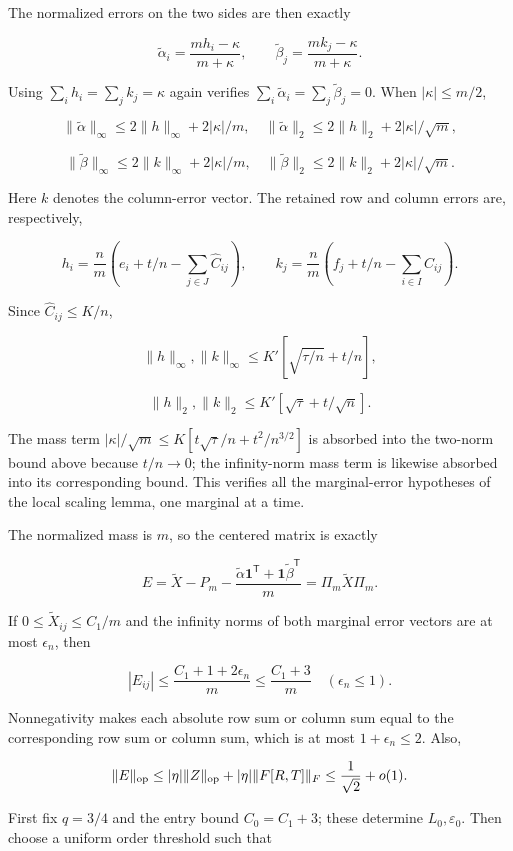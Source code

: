 \documentclass[11pt,a4paper]{article}
\begin{document}
The normalized errors on the two sides are then exactly

\[
\widetilde\alpha_i=\frac{mh_i-\kappa}{m+\kappa},\qquad
\widetilde\beta_j=\frac{mk_j-\kappa}{m+\kappa}.
\]

Using \(\sum_ih_i=\sum_jk_j=\kappa\) again verifies \(\sum_i\widetilde\alpha_i=\sum_j\widetilde\beta_j=0\). When \(|\kappa|\le m/2\),

\[
\|\widetilde\alpha\|_\infty\le2\|h\|_\infty+2|\kappa|/m,
\quad\|\widetilde\alpha\|_2\le2\|h\|_2+2|\kappa|/\sqrt m,
\]

\[
\|\widetilde\beta\|_\infty\le2\|k\|_\infty+2|\kappa|/m,
\quad\|\widetilde\beta\|_2\le2\|k\|_2+2|\kappa|/\sqrt m.
\]

Here \(k\) denotes the column-error vector. The retained row and column errors are, respectively,

\[
h_i=\frac nm\left(e_i+t/n-\sum_{j\in J}\widehat C_{ij}\right),\qquad
k_j=\frac nm\left(f_j+t/n-\sum_{i\in I}\widehat C_{ij}\right).
\]

Since \(\widehat C_{ij}\le K/n\),

\[
\|h\|_\infty,\|k\|_\infty\le K'[\sqrt{\tau/n}+t/n],
\]

\[
\|h\|_2,\|k\|_2\le K'[\sqrt\tau+t/\sqrt n].
\]

The mass term \(|\kappa|/\sqrt m\le K[t\sqrt\tau/n+t^2/n^{3/2}]\) is absorbed into the two-norm bound above because \(t/n\to0\); the infinity-norm mass term is likewise absorbed into its corresponding bound. This verifies all the marginal-error hypotheses of the local scaling lemma, one marginal at a time.

The normalized mass is \(m\), so the centered matrix is exactly

\[
E=\widetilde X-P_m-\frac{\widetilde\alpha\mathbf1^{\mathsf T}
+\mathbf1\widetilde\beta^{\mathsf T}}m
=\Pi_m\widetilde X\Pi_m.
\]

If \(0\le\widetilde X_{ij}\le C_1/m\) and the infinity norms of both marginal error vectors are at most \(\epsilon_n\), then

\[
|E_{ij}|\le\frac{C_1+1+2\epsilon_n}{m}\le\frac{C_1+3}{m}
\quad(\epsilon_n\le1).
\]

Nonnegativity makes each absolute row sum or column sum equal to the corresponding row sum or column sum, which is at most \(1+\epsilon_n\le2\). Also,

\[
\|E\|_{\rm op}\le|\eta|\|Z\|_{\rm op}+|\eta|\|F[R,T]\|_F
\le\frac1{\sqrt2}+o(1).
\]

First fix \(q=3/4\) and the entry bound \(C_0=C_1+3\); these determine \(L_0,\varepsilon_0\). Then choose a uniform order threshold such that
\end{document}
